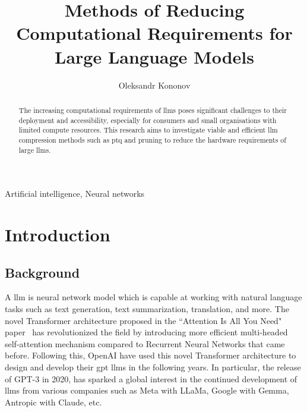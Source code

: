 \documentclass{ifacconf}
\begin{document}
	
	\begin{frontmatter}
		
		\title{Methods of Reducing Computational Requirements for Large Language Models} 
		
		\author[First]{Oleksandr Kononov} 
		
		\address[First]{South East Technological University, 
			Cork Road, Waterford, Ireland (e-mail: 20071032@mail.wit.ie).}
		\begin{abstract}                %
			The increasing computational requirements of \glspl{llm} poses significant challenges to their deployment and accessibility, especially for consumers and small organisations with limited compute resources. This research aims to investigate viable and efficient \gls{llm} compression methods such as \gls{ptq} and pruning to reduce the hardware requirements of large \glspl{llm}. 
		\end{abstract}
		
		\begin{keyword}
			Artificial intelligence, Neural networks
		\end{keyword}
		
	\end{frontmatter}
	\section{Introduction}
	\subsection{Background}
	A \gls{llm} is neural network model which is capable at working with natural language tasks such as text generation, text summarization, translation, and more. The novel Transformer architecture proposed in the ``Attention Is All You Need" paper~\cite{vaswani2017attentionneed} has revolutionized the field by introducing more efficient multi-headed self-attention mechanism compared to Recurrent Neural Networks that came before.
	Following this, OpenAI have used this novel Transformer architecture to design and develop their \gls{gpt} \glspl{llm} in the following years. In particular, the release of GPT-3 in 2020, has sparked a global interest in the continued development of \glspl{llm} from various companies such as Meta with LLaMa, Google with Gemma, Antropic with Claude, etc.
	
\end{document}

